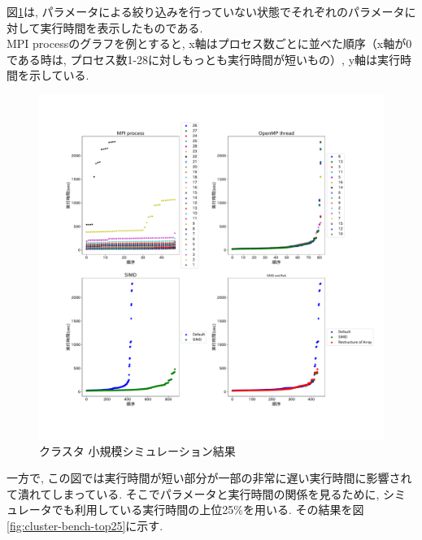 図\ref{fig:cluster-bench}は, パラメータによる絞り込みを行っていない状態でそれぞれのパラメータに対して実行時間を表示したものである.\\
MPI processのグラフを例とすると, x軸はプロセス数ごとに並べた順序（x軸が0である時は, プロセス数1-28に対しもっとも実行時間が短いもの）,
y軸は実行時間を示している.\\
\begin{figure}[htb]
 \begin{center}
    \includegraphics[width=14cm]{./images/cluster-bench.pdf}
    \caption{クラスタ 小規模シミュレーション結果}
    \label{fig:cluster-bench}
 \end{center}
\end{figure}
一方で, この図では実行時間が短い部分が一部の非常に遅い実行時間に影響されて潰れてしまっている.
そこでパラメータと実行時間の関係を見るために, シミュレータでも利用している実行時間の上位25\%を用いる. その結果を図\ref{fig:cluster-bench-top25}に示す.\\
